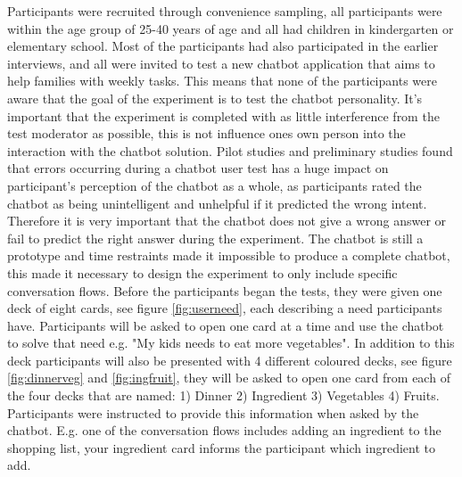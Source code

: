     Participants were recruited through convenience sampling, all participants were within the age group of 25-40 years of age and all had children in kindergarten or elementary school. Most of the participants had also participated in the earlier interviews, and all were invited to test a new chatbot application that aims to help families with weekly tasks. This means that none of the participants were aware that the goal of the experiment is to test the chatbot personality. It's important that the experiment is completed with as little interference from the test moderator as possible, this is not influence ones own person into the interaction with the chatbot solution. Pilot studies and preliminary studies found that errors occurring during a chatbot user test has a huge impact on participant's perception of the chatbot as a whole, as participants rated the chatbot as being unintelligent and unhelpful if it predicted the wrong intent. Therefore it is very important that the chatbot does not give a wrong answer or fail to predict the right answer during the experiment. The chatbot is still a prototype and time restraints made it impossible to produce a complete chatbot, this made it necessary to design the experiment to only include specific conversation flows. Before the participants began the tests, they were given one deck of eight cards, see figure \ref{fig:userneed}, each describing a need participants have. Participants will be asked to open one card at a time and use the chatbot to solve that need e.g. "My kids needs to eat more vegetables". In addition to this deck participants will also be presented with 4 different coloured decks, see figure \ref{fig:dinnerveg} and \ref{fig:ingfruit}, they will be asked to open one card from each of the four decks that are named: 1) Dinner 2) Ingredient 3) Vegetables 4) Fruits. Participants were instructed to provide this information when asked by the chatbot. E.g. one of the conversation flows includes adding an ingredient to the shopping list, your ingredient card informs the participant which ingredient to add.
   
